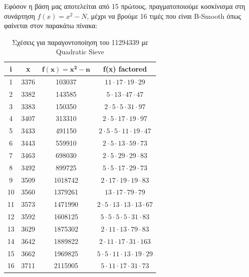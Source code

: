 \documentclass[12pt]{article}
\numberwithin{equation}{section}
\begin{document}
Εφόσον η βάση μας αποτελείται από 15 πρώτους, πραγματοποιούμε κοσκίνισμα στη συνάρτηση $f(x)=x^2-N$, μέχρι να βρούμε 16 τιμές που είναι B-Smooth όπως φαίνεται στον παρακάτω πίνακα:
\newpage
\begin{table}[t]
    \centering
    \caption{Σχέσεις για παραγοντοποίηση του 11294339 με Quadratic Sieve}
    \label{Quadratic Sieve factors}
    \setlength{\tabcolsep}{0.5em}
    \begin{adjustbox}{width=0.54\textwidth}
    \begin{tabular}{|c|c|c|c|}
    \hline
    \textbf{i} & \textbf{x} & $\mathbf{f(x)=x^2-n}$ & \textbf{f(x) factored} \\
    \hline
    1 & 3376 & 103037 & $11 \cdot 17 \cdot 19 \cdot 29$ \\
    \hline
    2 & 3382 & 143585 & $5 \cdot 13 \cdot 47 \cdot 47$ \\
    \hline
    3 & 3383 & 150350 & $2 \cdot 5 \cdot 5 \cdot 31 \cdot 97$ \\
    \hline
    4 & 3407 & 313310 & $2 \cdot 5 \cdot 17 \cdot 19 \cdot 97$ \\
    \hline
    5 & 3433 & 491150 & $2 \cdot 5 \cdot 5 \cdot 11 \cdot 19 \cdot 47$ \\
    \hline
    6 & 3443 & 559910 & $2 \cdot 5 \cdot 13 \cdot 59 \cdot 73$ \\
    \hline
    7 & 3463 & 698030 & $2 \cdot 5 \cdot 29 \cdot 29 \cdot 83$ \\
    \hline
    8 & 3492 & 899725 & $5 \cdot 5 \cdot 17 \cdot 29 \cdot 73$ \\
    \hline
    9 & 3509 & 1018742 & $2 \cdot 17 \cdot 19 \cdot 19 \cdot 83$ \\
    \hline
    10 & 3560 & 1379261 & $13 \cdot 17 \cdot 79 \cdot 79$ \\
    \hline
    11 & 3573 & 1471990 & $2 \cdot 5 \cdot 13 \cdot 13 \cdot 13 \cdot 67$ \\
    \hline
    12 & 3592 & 1608125 & $5 \cdot 5 \cdot 5 \cdot 5 \cdot 31 \cdot 83$ \\
    \hline
    13 & 3629 & 1875302 & $2 \cdot 11 \cdot 13 \cdot 79 \cdot 83$ \\
    \hline
    14 & 3642 & 1889822 & $2 \cdot 11 \cdot 17 \cdot 31 \cdot 163$ \\
    \hline
    15 & 3662 & 1969825 & $5 \cdot 5 \cdot 11 \cdot 13 \cdot 19 \cdot 29$ \\
    \hline
    16 & 3711 & 2115905 & $5 \cdot 11 \cdot 17 \cdot 31 \cdot 73$ \\
    \hline
    \end{tabular}
    \end{adjustbox}
\end{table}
\end{document}
